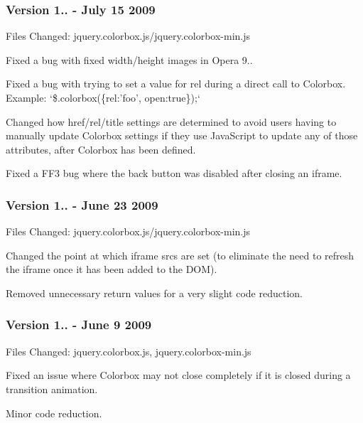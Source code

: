 \subsubsection*{Version 1.. -\/ July 15 2009}

Files Changed\-: jquery.\-colorbox.\-js/jquery.colorbox-\/min.\-js


\begin{DoxyItemize}
\item Fixed a bug with fixed width/height images in Opera 9..
\item Fixed a bug with trying to set a value for rel during a direct call to Colorbox. Example\-: `\$.colorbox(\{rel\-:'foo', open\-:true\});`
\item Changed how href/rel/title settings are determined to avoid users having to manually update Colorbox settings if they use Java\-Script to update any of those attributes, after Colorbox has been defined.
\item Fixed a F\-F3 bug where the back button was disabled after closing an iframe.
\end{DoxyItemize}

\subsubsection*{Version 1.. -\/ June 23 2009}

Files Changed\-: jquery.\-colorbox.\-js/jquery.colorbox-\/min.\-js


\begin{DoxyItemize}
\item Changed the point at which iframe srcs are set (to eliminate the need to refresh the iframe once it has been added to the D\-O\-M).
\item Removed unnecessary return values for a very slight code reduction.
\end{DoxyItemize}

\subsubsection*{Version 1.. -\/ June 9 2009}

Files Changed\-: jquery.\-colorbox.\-js, jquery.\-colorbox-\/min.\-js


\begin{DoxyItemize}
\item Fixed an issue where Colorbox may not close completely if it is closed during a transition animation.
\item Minor code reduction.
\end{DoxyItemize}

